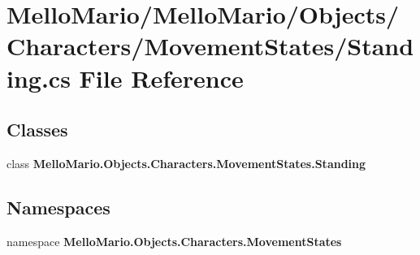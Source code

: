 \section{Mello\+Mario/\+Mello\+Mario/\+Objects/\+Characters/\+Movement\+States/\+Standing.cs File Reference}
\label{Standing_8cs}
\subsection*{Classes}
\begin{DoxyCompactItemize}
\item 
class \textbf{ Mello\+Mario.\+Objects.\+Characters.\+Movement\+States.\+Standing}
\end{DoxyCompactItemize}
\subsection*{Namespaces}
\begin{DoxyCompactItemize}
\item 
namespace \textbf{ Mello\+Mario.\+Objects.\+Characters.\+Movement\+States}
\end{DoxyCompactItemize}
